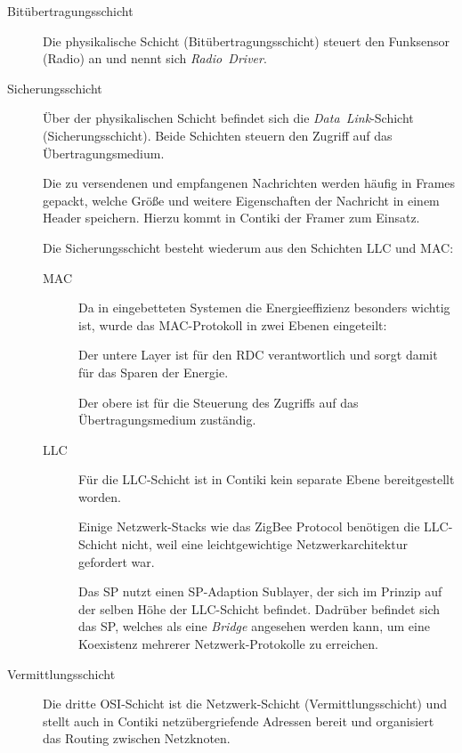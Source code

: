 	\begin{description}
	\item[Bitübertragungsschicht]
		Die physikalische Schicht (Bitübertragungsschicht)
		steuert den Funksensor (Radio) an
		und nennt sich \emph{Radio~Driver}.

	\item[Sicherungsschicht]
		Über der physikalischen Schicht befindet sich
		die \emph{Data~Link}-Schicht (Sicherungsschicht).
		Beide Schichten steuern den Zugriff auf das Übertragungsmedium.

		Die zu versendenen und empfangenen Nachrichten werden häufig in
		Frames gepackt, welche Größe und weitere Eigenschaften der
		Nachricht in einem Header speichern. Hierzu kommt in Contiki
		der Framer zum Einsatz.

		Die Sicherungsschicht besteht wiederum aus den Schichten
		\ac{LLC} und \ac{MAC}:
		\begin{description}
		\item[\acf{MAC}]
			Da in eingebetteten Systemen die Energieeffizienz
			besonders wichtig ist, wurde das \ac{MAC}-Protokoll in
			zwei Ebenen eingeteilt:

			Der untere Layer ist für den \acf{RDC} verantwortlich
			und sorgt damit für das Sparen der Energie.

			Der obere ist für die Steuerung des Zugriffs
			auf das Übertragungsmedium zuständig.

		\item[\acf{LLC}]
			Für die \acs{LLC}-Schicht ist in Contiki kein separate
			Ebene bereitgestellt worden.

			Einige Netzwerk-Stacks wie das ZigBee Protocol
			benötigen die \acs{LLC}-Schicht nicht, weil eine
			leichtgewichtige Netzwerkarchitektur gefordert war.

			Das \acf{SP} nutzt einen \acs{SP}-Adaption Sublayer,
			der sich im Prinzip auf der selben Höhe der
			\acs{LLC}-Schicht befindet. Dadrüber befindet sich das
			\acl{SP}, welches als eine \emph{Bridge} angesehen
			werden kann, um eine Koexistenz mehrerer
			Netzwerk-Protokolle zu erreichen.
			\autocite{he2007implSPforContiki}
		\end{description}

	\item[Vermittlungsschicht]
		Die dritte OSI-Schicht ist die Netzwerk-Schicht
		(Vermittlungsschicht) und stellt auch in Contiki
		netzübergriefende Adressen bereit und organisiert das Routing
		zwischen Netzknoten.
	\end{description}

